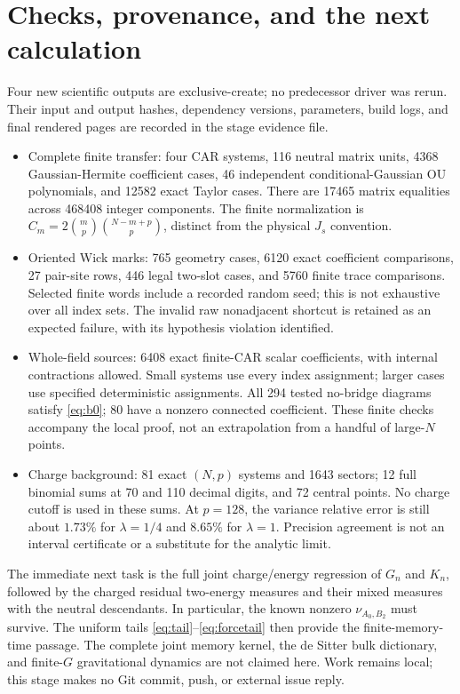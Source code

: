 \documentclass[11pt]{article}
\begin{document}
\section{Checks, provenance, and the next calculation}
Four new scientific outputs are exclusive-create; no predecessor
driver was rerun. Their input and output hashes, dependency versions,
parameters, build logs, and final rendered pages are recorded in the
stage evidence file.
\begin{itemize}
\item Complete finite transfer: four CAR systems, 116 neutral matrix
units, 4368 Gaussian-Hermite coefficient cases, 46 independent
conditional-Gaussian OU polynomials, and 12582 exact Taylor cases.
There are 17465 matrix equalities across 468408 integer components.
The finite normalization is $C_m=2\binom mp\binom{N-m+p}p$,
distinct from the physical $J_s$ convention.
\item Oriented Wick marks: 765 geometry cases, 6120 exact coefficient
comparisons, 27 pair-site rows, 446 legal two-slot cases, and
5760 finite trace comparisons. Selected finite words include a
recorded random seed; this is not exhaustive over all index sets.
The invalid raw nonadjacent shortcut is retained as an expected
failure, with its hypothesis violation identified.
\item Whole-field sources: 6408 exact finite-CAR scalar coefficients,
with internal contractions allowed. Small systems use every index
assignment; larger cases use specified deterministic assignments.
All 294 tested no-bridge diagrams satisfy \eqref{eq:b0}; 80 have a
nonzero connected coefficient. These finite checks accompany the
local proof, not an extrapolation from a handful of large-$N$ points.
\item Charge background: 81 exact $(N,p)$ systems and 1643 sectors;
12 full binomial sums at 70 and 110 decimal digits, and 72 central
points. No charge cutoff is used in these sums. At $p=128$, the
variance relative error is still about $1.73\%$ for $\lambda=1/4$
and $8.65\%$ for $\lambda=1$. Precision agreement is not an
interval certificate or a substitute for the analytic limit.
\end{itemize}

The immediate next task is the full joint charge/energy regression
of $G_n$ and $K_n$, followed by the charged residual two-energy
measures and their mixed measures with the neutral descendants.
In particular, the known nonzero $\nu_{A_0,B_2}$ must survive.
The uniform tails \eqref{eq:tail}--\eqref{eq:forcetail} then provide
the finite-memory-time passage. The complete joint memory kernel,
the de Sitter bulk dictionary, and finite-$G$ gravitational dynamics
are not claimed here. Work remains local; this stage makes no Git
commit, push, or external issue reply.
\end{document}
